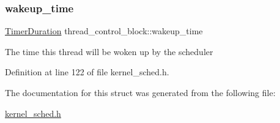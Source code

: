 \subsubsection{\texorpdfstring{wakeup\+\_\+time}{wakeup\_time}}
{\footnotesize\ttfamily \hyperlink{bios_8h_ae7291e5cd742fb9bc6d4aaa0d51bd0ee}{Timer\+Duration} thread\+\_\+control\+\_\+block\+::wakeup\+\_\+time}

The time this thread will be woken up by the scheduler 

Definition at line 122 of file kernel\+\_\+sched.\+h.



The documentation for this struct was generated from the following file\+:\begin{DoxyCompactItemize}
\item 
\hyperlink{kernel__sched_8h}{kernel\+\_\+sched.\+h}\end{DoxyCompactItemize}
